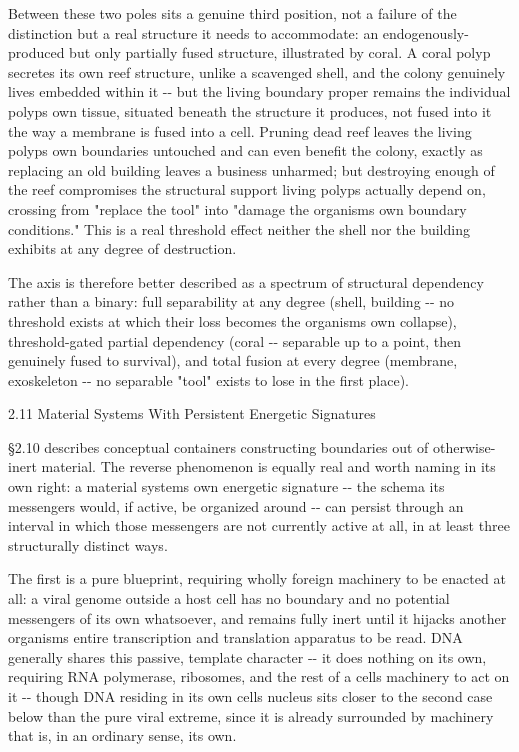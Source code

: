 \documentclass[
]{article}
\begin{document}
Between these two poles sits a genuine third position, not a failure of
the distinction but a real structure it needs to accommodate: an
endogenously-produced but only partially fused structure, illustrated by
coral. A coral polyp secretes its own reef structure, unlike a scavenged
shell, and the colony genuinely lives embedded within it -\/- but the
living boundary proper remains the individual polyps own tissue,
situated beneath the structure it produces, not fused into it the way a
membrane is fused into a cell. Pruning dead reef leaves the living
polyps own boundaries untouched and can even benefit the colony, exactly
as replacing an old building leaves a business unharmed; but destroying
enough of the reef compromises the structural support living polyps
actually depend on, crossing from "replace the tool" into "damage the
organisms own boundary conditions." This is a real threshold effect
neither the shell nor the building exhibits at any degree of
destruction.

The axis is therefore better described as a spectrum of structural
dependency rather than a binary: full separability at any degree (shell,
building -\/- no threshold exists at which their loss becomes the
organisms own collapse), threshold-gated partial dependency (coral -\/-
separable up to a point, then genuinely fused to survival), and total
fusion at every degree (membrane, exoskeleton -\/- no separable "tool"
exists to lose in the first place).

2.11 Material Systems With Persistent Energetic Signatures

§2.10 describes conceptual containers constructing boundaries out of
otherwise-inert material. The reverse phenomenon is equally real and
worth naming in its own right: a material systems own energetic
signature -\/- the schema its messengers would, if active, be organized
around -\/- can persist through an interval in which those messengers
are not currently active at all, in at least three structurally distinct
ways.

The first is a pure blueprint, requiring wholly foreign machinery to be
enacted at all: a viral genome outside a host cell has no boundary and
no potential messengers of its own whatsoever, and remains fully inert
until it hijacks another organisms entire transcription and translation
apparatus to be read. DNA generally shares this passive, template
character -\/- it does nothing on its own, requiring RNA polymerase,
ribosomes, and the rest of a cells machinery to act on it -\/- though
DNA residing in its own cells nucleus sits closer to the second case
below than the pure viral extreme, since it is already surrounded by
machinery that is, in an ordinary sense, its own.
\end{document}

